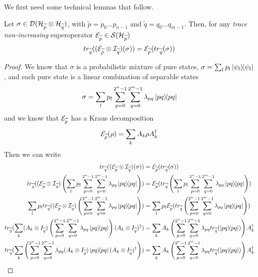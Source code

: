 We first need some technical lemmas that follow. 
\newcommand{\discQ}{disc(\widetilde{q})}
\newcommand{\trQ}{tr_{\widetilde{q}}}

\begin{lemma}\label{trace_and_sop}
Let $\sigma \in  \mathcal{D}(\mathcal{H}_{\widetilde{p}} \otimes \mathcal{H}_{\widetilde{q}})$, with $\widetilde{p} = p_0 \ldots p_{n-1}$ and $\widetilde{q} = q_0 \ldots q_{m-1}$. Then, for any \textit{trace non-increasing} superoperator $\mathcal{E}_{\widetilde{p}} \in \mathcal{S}(\mathcal{H}_{\widetilde{p}})$
\[ \trQ((\sop_{\widetilde{p}} \otimes \mathcal{I}_{\widetilde{q}})(\sigma)) = \sop_{\widetilde{p}}(\trQ(\sigma))
\]
\end{lemma}
\begin{proof}
We know that $\sigma$ is a probabilistic mixture of pure states, $\sigma = \sum_l p_l \ket{\psi_l}\!\!\bra{\psi_l}$, and each pure state is a linear combination of separable states 
\[\sigma = \sum_l p_l \sum_{p = 0}^{2^n-1} \sum_{q = 0}^{2^m-1} \lambda_{pq} \ket{pq}\!\!\bra{pq}\]
and we know that $\mathcal{E}_{\widetilde{p}}$ has a Kraus decomposition 
\[\mathcal{E}_{\widetilde{p}}(\rho) = \sum_k A_k \rho A_k^\dagger\]
Then we can write 
\hspace*{-2cm}\begin{align*}
\trQ((\sop_{\widetilde{p}} \otimes \mathcal{I}_{\widetilde{q}})(\sigma)) &= \sop_{\widetilde{p}}(\trQ(\sigma)) 
\\ 
\trQ((\sop_{\widetilde{p}} \otimes \mathcal{I}_{\widetilde{q}})\left(\sum_l p_l \sum_{p = 0}^{2^n-1} \sum_{q = 0}^{2^m-1} \lambda_{pq} \proj{pq}\right)) &= \sop_{\widetilde{p}}(\trQ\left(\sum_l p_l \sum_{p = 0}^{2^n-1} \sum_{q = 0}^{2^m-1} \lambda_{pq} \proj{pq}\right))
\\
\sum_l p_l \trQ((\sop_{\widetilde{p}} \otimes \mathcal{I}_{\widetilde{q}})\left( \sum_{p = 0}^{2^n-1} \sum_{q = 0}^{2^m-1} \lambda_{pq} \proj{pq}\right)) 
&= \sum_l p_l \sop_{\widetilde{p}}(\trQ\left( \sum_{p = 0}^{2^n-1} \sum_{q = 0}^{2^m-1} \lambda_{pq} \proj{pq}\right))
\\
\trQ(\sum_k (A_k \otimes I_{\widetilde{q}})\left( \sum_{p = 0}^{2^n-1} \sum_{q = 0}^{2^m-1} \lambda_{pq} \proj{pq}\right)(A_k \otimes I_{\widetilde{q}})^\dagger )
&= \sum_k A_k\left( \sum_{p = 0}^{2^n-1} \sum_{q = 0}^{2^m-1} \lambda_{pq} \trQ(\proj{pq})\right) A_k^\dagger 
\\
\trQ(\sum_k  \left( \sum_{p = 0}^{2^n-1} \sum_{q = 0}^{2^m-1} \lambda_{pq} (A_k \otimes I_{\widetilde{q}}) \proj{pq} (A_k \otimes I_{\widetilde{q}})^\dagger  \right) )
&= \sum_k A_k\left( \sum_{p = 0}^{2^n-1} \sum_{q = 0}^{2^m-1} \lambda_{pq} \trQ(\proj{pq})\right) A_k^\dagger

\end{align*}
\end{proof}
